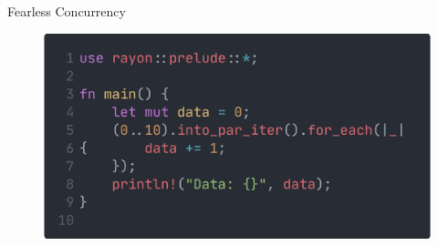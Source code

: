 \begin{frame}{Fearless Concurrency}
    \begin{figure}
        \centering
        \includegraphics[width=\textwidth]{Figuras/fearlessconcurrency.png}
    \end{figure}
\end{frame}

